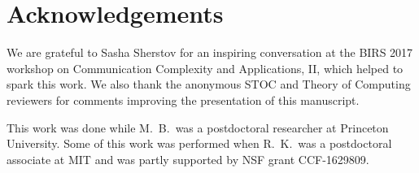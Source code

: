 \documentclass[11pt, letterpaper, fleqn]{article}
\theoremstyle{plain}
\begin{document}
\section*{Acknowledgements} We are grateful to Sasha Sherstov for an inspiring conversation at the BIRS 2017 workshop on Communication Complexity and Applications, II, which helped to spark this work. We also thank the anonymous STOC and Theory of Computing reviewers for comments improving the presentation of this manuscript.

This work was done while M.~B.~was a postdoctoral researcher at Princeton University. Some of this work was performed when R.~K.~was a postdoctoral associate at MIT and was partly supported by NSF grant CCF-1629809. 




 
\end{document}
